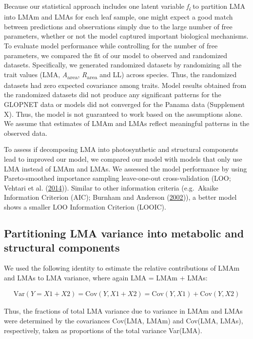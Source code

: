 \documentclass[
  12pt,
]{article}
\begin{document}
Because our statistical approach includes one latent variable \emph{f\textsubscript{i}} to partition LMA into LMAm and LMAs for each leaf sample, one might expect a good match between predictions and observations simply due to the large number of free parameters, whether or not the model captured important biological mechanisms.
To evaluate model performance while controlling for the number of free parameters, we compared the fit of our model to observed and randomized datasets.
Specifically, we generated randomized datasets by randomizing all the trait values (LMA, \emph{A}\textsubscript{area}, \emph{R}\textsubscript{area} and LL) across species.
Thus, the randomized datasets had zero expected covariance among traits.
Model results obtained from the randomized datasets did not produce any significant patterns for the GLOPNET data or models did not converged for the Panama data (Supplement X).
Thus, the model is not guaranteed to work based on the assumptions alone.
We assume that estimates of LMAm and LMAs reflect meaningful patterns in the observed data.

To assess if decomposing LMA into photosynthetic and structural components lead to improved our model, we compared our model with models that only use LMA instead of LMAm and LMAs.
We assessed the model performance by using Pareto-smoothed importance sampling leave-one-out cross-validation (LOO; Vehtari et al. (\protect\hyperlink{ref-Vehtari2014}{2014})).
Similar to other information criteria (e.g.~Akaike Information Criterion (AIC); Burnham and Anderson (\protect\hyperlink{ref-Burnham2002}{2002})), a better model shows a smaller LOO Information Criterion (LOOIC).

\hypertarget{partitioning-lma-variance-into-metabolic-and-structural-components}{%
\subsection{Partitioning LMA variance into metabolic and structural components}\label{partitioning-lma-variance-into-metabolic-and-structural-components}}

We used the following identity to estimate the relative contributions of LMAm and LMAs to LMA variance, where again LMA = LMAm + LMAs:

\begin{align}
\mathrm{Var}(Y = X1 + X2) = \mathrm{Cov}(Y, X1+X2) = \mathrm{Cov}(Y,X1) + \mathrm{Cov}(Y,X2) \label{eq:var}
\end{align}

Thus, the fractions of total LMA variance due to variance in LMAm and LMAs were determined by the covariances Cov(LMA, LMAm) and Cov(LMA, LMAs), respectively, taken as proportions of the total variance Var(LMA).
\end{document}
